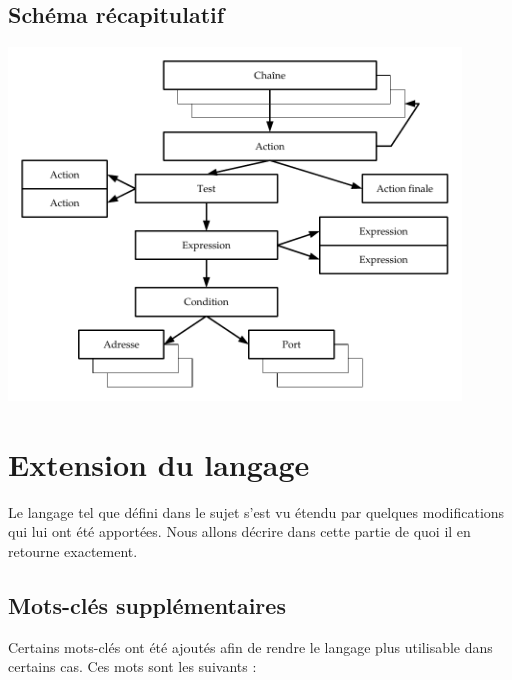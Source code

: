 \documentclass[a4paper,11pt]{report}
\begin{document}
\section{Schéma récapitulatif}

\begin{center}
  \noindent\includegraphics[keepaspectratio,width=0.9\textwidth]{schema}
\end{center}

\chapter{Extension du langage}

\begin{intro}
  Le langage tel que défini dans le sujet s'est vu étendu par quelques
  modifications qui lui ont été apportées. Nous allons décrire dans cette
  partie de quoi il en retourne exactement.
\end{intro}

\section{Mots-clés supplémentaires}

Certains mots-clés ont été ajoutés afin de rendre le langage plus utilisable
dans certains cas. Ces mots sont les suivants :
\end{document}
